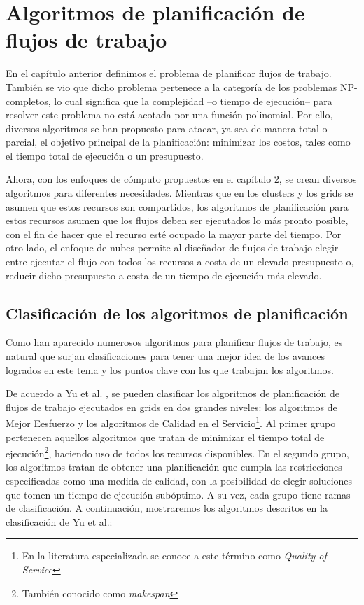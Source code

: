 \chapter{Algoritmos de planificación de flujos de trabajo}
En el capítulo anterior definimos el problema de planificar flujos de trabajo. También se vio que dicho problema pertenece a la categoría de los problemas NP-completos, lo cual significa que la complejidad --o tiempo de ejecución-- para resolver este problema no está acotada por una función polinomial. Por ello, diversos algoritmos se han propuesto para atacar, ya sea de manera total o parcial, el objetivo principal de la planificación: minimizar los costos, tales como el tiempo total de ejecución o un presupuesto.

Ahora, con los enfoques de cómputo propuestos en el capítulo 2, se crean diversos algoritmos para diferentes necesidades. Mientras que en los clusters y los grids se asumen que estos recursos son compartidos, los algoritmos de planificación para estos recursos asumen que los flujos deben ser ejecutados lo más pronto posible, con el fin de hacer que el recurso esté ocupado la mayor parte del tiempo. Por otro lado, el enfoque de nubes permite al diseñador de flujos de trabajo elegir entre ejecutar el flujo con todos los recursos a costa de un elevado presupuesto o, reducir dicho presupuesto a costa de un tiempo de ejecución más elevado.

\section{Clasificación de los algoritmos de planificación}
Como han aparecido numerosos algoritmos para planificar flujos de trabajo, es natural que surjan clasificaciones \cite{topcuoglu2002performance} \cite{yu2008workflow} para tener una mejor idea de los avances logrados en este tema y los puntos clave con los que trabajan los algoritmos.

De acuerdo a Yu et al. \cite{yu2008workflow}, se pueden clasificar los algoritmos de planificación de flujos de trabajo ejecutados en grids en dos grandes niveles: los algoritmos de Mejor Eesfuerzo y los algoritmos de Calidad en el Servicio\footnote{En la literatura especializada se conoce a este término como \emph{Quality of Service}}. Al primer grupo pertenecen aquellos algoritmos que tratan de minimizar el tiempo total de ejecución\footnote{También conocido como \emph{makespan}}, haciendo uso de todos los recursos disponibles. En el segundo grupo, los algoritmos tratan de obtener una planificación que cumpla las restricciones especificadas como una medida de calidad, con la posibilidad de elegir soluciones que tomen un tiempo de ejecución subóptimo. A su vez, cada grupo tiene ramas de clasificación. A continuación, mostraremos los algoritmos descritos en la clasificación de Yu et al.: %

